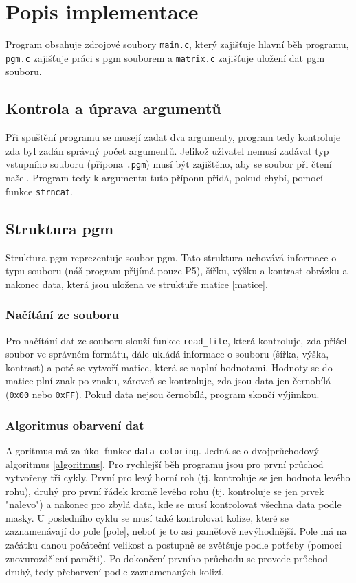 \documentclass[12pt, a4paper]{article}
\begin{document}
\section{Popis implementace}
Program obsahuje zdrojové soubory \texttt{main.c}, který zajišťuje hlavní běh programu, \texttt{pgm.c} zajišťuje práci s pgm souborem a \texttt{matrix.c} zajišťuje uložení dat pgm souboru.

\subsection{Kontrola a úprava argumentů}
Při spuštění programu se musejí zadat dva argumenty, program tedy kontroluje zda byl zadán správný počet argumentů. Jelikož uživatel nemusí zadávat typ vstupního souboru (přípona \texttt{.pgm}) musí být zajištěno, aby se soubor při čtení našel. Program tedy k argumentu tuto příponu přidá, pokud chybí, pomocí funkce \texttt{strncat}.

\subsection{Struktura pgm}
Struktura pgm reprezentuje soubor pgm. Tato struktura uchovává informace o typu souboru (náš program přijímá pouze P5), šířku, výšku a kontrast obrázku a nakonec data, která jsou uložena ve struktuře matice \ref{matice}.

\subsubsection{Načítání ze souboru}
Pro načítání dat ze souboru slouží funkce \texttt{read\_file}, která kontroluje, zda přišel soubor ve správném formátu, dále ukládá informace o souboru (šířka, výška, kontrast) a poté se vytvoří matice, která  se naplní hodnotami. Hodnoty se do matice plní znak po znaku, zároveň se kontroluje, zda jsou data jen černobílá (\texttt{0x00} nebo \texttt{0xFF}). Pokud data nejsou černobílá, program skončí výjimkou.

\subsubsection{Algoritmus obarvení dat}
Algoritmus má za úkol funkce \texttt{data\_coloring}. Jedná se o dvojprůchodový algoritmus \cite{CCL} \ref{algoritmus}. Pro rychlejší běh programu jsou pro první průchod vytvořeny tři cykly. První pro levý horní roh (tj. kontroluje se jen hodnota levého rohu), druhý pro první řádek kromě levého rohu (tj. kontroluje se jen prvek "nalevo") a nakonec pro zbylá data, kde se musí kontrolovat všechna data podle masky. U posledního cyklu se musí také kontrolovat kolize, které se zaznamenávají do pole \ref{pole}, neboť je to asi paměťově nevýhodnější. Pole má na začátku danou počáteční velikost a postupně se zvětšuje podle potřeby (pomocí znovurozdělení paměti). Po dokončení prvního průchodu se provede průchod druhý, tedy přebarvení podle zaznamenaných kolizí. 
\end{document}
